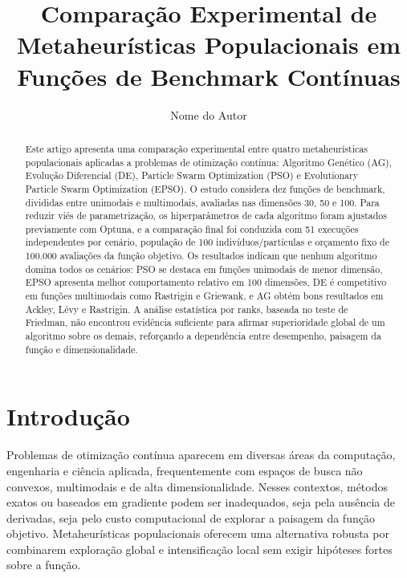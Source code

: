 \documentclass[runningheads]{llncs}
\begin{document}
\title{Comparação Experimental de Metaheurísticas Populacionais em Funções de Benchmark Contínuas}

\author{Nome do Autor}

\maketitle

\begin{abstract}
Este artigo apresenta uma comparação experimental entre quatro metaheurísticas populacionais aplicadas a problemas de otimização contínua: Algoritmo Genético (AG), Evolução Diferencial (DE), Particle Swarm Optimization (PSO) e Evolutionary Particle Swarm Optimization (EPSO). O estudo considera dez funções de benchmark, divididas entre unimodais e multimodais, avaliadas nas dimensões 30, 50 e 100. Para reduzir viés de parametrização, os hiperparâmetros de cada algoritmo foram ajustados previamente com Optuna, e a comparação final foi conduzida com 51 execuções independentes por cenário, população de 100 indivíduos/partículas e orçamento fixo de 100.000 avaliações da função objetivo. Os resultados indicam que nenhum algoritmo domina todos os cenários: PSO se destaca em funções unimodais de menor dimensão, EPSO apresenta melhor comportamento relativo em 100 dimensões, DE é competitivo em funções multimodais como Rastrigin e Griewank, e AG obtém bons resultados em Ackley, Lévy e Rastrigin. A análise estatística por ranks, baseada no teste de Friedman, não encontrou evidência suficiente para afirmar superioridade global de um algoritmo sobre os demais, reforçando a dependência entre desempenho, paisagem da função e dimensionalidade.
\end{abstract}

\section{Introdução}

Problemas de otimização contínua aparecem em diversas áreas da computação, engenharia e ciência aplicada, frequentemente com espaços de busca não convexos, multimodais e de alta dimensionalidade. Nesses contextos, métodos exatos ou baseados em gradiente podem ser inadequados, seja pela ausência de derivadas, seja pelo custo computacional de explorar a paisagem da função objetivo. Metaheurísticas populacionais oferecem uma alternativa robusta por combinarem exploração global e intensificação local sem exigir hipóteses fortes sobre a função.
\end{document}
